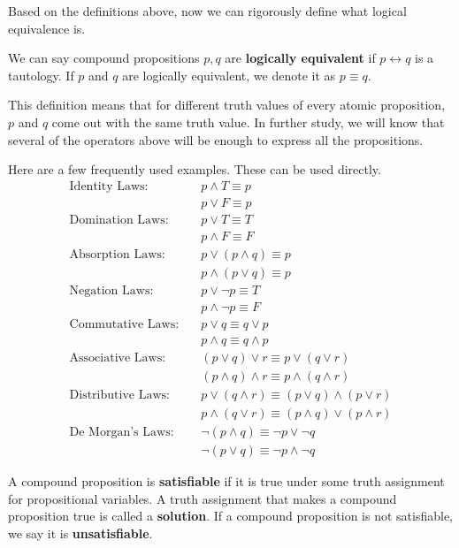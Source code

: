 Based on the definitions above, now we can rigorously define what logical equivalence is.

\begin{definition}
We can say compound propositions $p, q$ are \textbf{logically equivalent} if $p \leftrightarrow q$ is a tautology. If $p$ and $q$ are logically equivalent, we denote it as $p \equiv q$.
\end{definition}

This definition means that for different truth values of every atomic proposition, $p$ and $q$ come out with the same truth value. In further study, we will know that several of the operators above will be enough to express all the propositions.

Here are a few frequently used examples. These can be used directly.
\begin{align*}
    \text{Identity Laws:} \quad & p \wedge T \equiv p \\
    & p \vee F \equiv p \\
    \text{Domination Laws:} \quad & p \vee T \equiv T \\
    & p \wedge F \equiv F \\
    \text{Absorption Laws:} \quad & p \vee (p \wedge q) \equiv p \\
    & p \wedge (p \vee q) \equiv p \\
    \text{Negation Laws:} \quad & p \vee \neg p \equiv T \\
    & p \wedge \neg p \equiv F \\
    \text{Commutative Laws:} \quad & p \vee q \equiv q \vee p \\
    & p \wedge q \equiv q \wedge p \\
    \text{Associative Laws:} \quad & (p \vee q) \vee r \equiv p \vee (q \vee r) \\
    & (p \wedge q) \wedge r \equiv p \wedge (q \wedge r) \\
    \text{Distributive Laws:} \quad & p \vee (q \wedge r) \equiv (p \vee q) \wedge (p \vee r) \\
    & p \wedge (q \vee r) \equiv (p \wedge q) \vee (p \wedge r) \\
    \text{De Morgan’s Laws:} \quad & \neg(p \wedge q) \equiv \neg p \vee \neg q \\
    & \neg(p \vee q) \equiv \neg p \wedge \neg q
\end{align*}

\begin{definition}[Satisfiability]
A compound proposition is \textbf{satisfiable} if it is true under some truth assignment for propositional variables. A truth assignment that makes a compound proposition true is called a \textbf{solution}. If a compound proposition is not satisfiable, we say it is \textbf{unsatisfiable}.
\end{definition}

